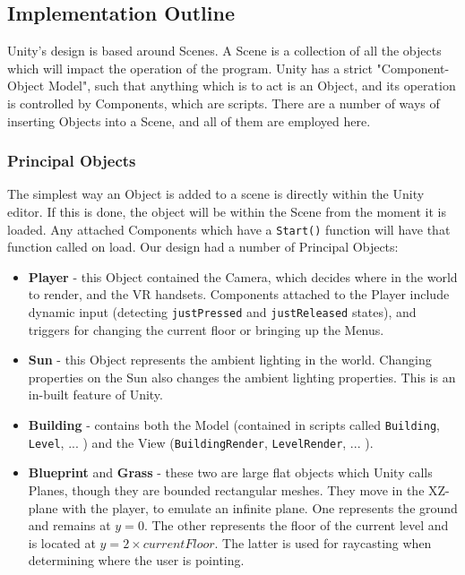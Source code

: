 \subsection{Implementation Outline}

Unity's design is based around Scenes. A Scene is a collection of all the objects which will impact the operation of the program. Unity has a strict "Component-Object Model", such that anything which is to act is an Object, and its operation is controlled by Components, which are scripts. There are a number of ways of inserting Objects into a Scene, and all of them are employed here.

\subsubsection*{Principal Objects}
The simplest way an Object is added to a scene is directly within the Unity editor. If this is done, the object will be within the Scene from the moment it is loaded. Any attached Components which have a \verb|Start()| function will have that function called on load. Our design had a number of Principal Objects:

\begin{itemize}
    \item \textbf{Player} - this Object contained the Camera, which decides where in the world to render, and the VR handsets. Components attached to the Player include dynamic input (detecting \verb|justPressed| and \verb|justReleased| states), and triggers for changing the current floor or bringing up the Menus.
    \item \textbf{Sun} - this Object represents the ambient lighting in the world. Changing properties on the Sun also changes the ambient lighting properties. This is an in-built feature of Unity.
    \item \textbf{Building} - contains both the Model (contained in scripts called \verb|Building|, \verb|Level|, ... ) and the View (\verb|BuildingRender|, \verb|LevelRender|, ... ). 
    \item \textbf{Blueprint} and \textbf{Grass} - these two are large flat objects which Unity calls Planes, though they are bounded rectangular meshes. They move in the XZ-plane with the player, to emulate an infinite plane. One represents the ground and remains at $y=0$. The other represents the floor of the current level and is located at $y=2 \times currentFloor$. The latter is used for raycasting when determining where the user is pointing.
\end{itemize}

